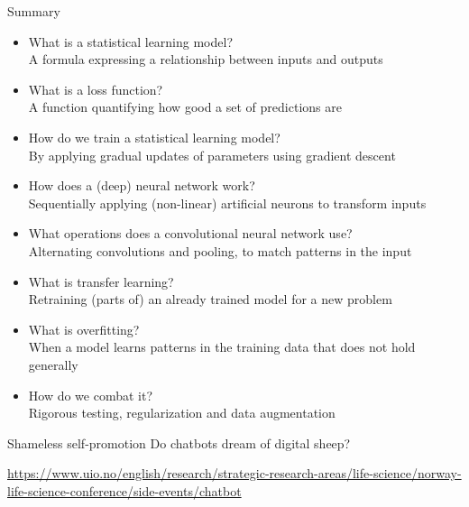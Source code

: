 \documentclass[8pt]{beamer}
\begin{document}
	\begin{frame}{Summary}
		\vfill
		\begin{itemize}
			\item{What is a statistical learning model?\\
				  \textcolor{answers}{A formula expressing a relationship between inputs and outputs}}
			\item{What is a loss function?\\
				  \textcolor{answers}{A function quantifying how good a set of predictions are}}
			\item{How do we train a statistical learning model?\\
				  \textcolor{answers}{By applying gradual updates of parameters using gradient descent}}
			\item{How does a (deep) neural network work?\\
				  \textcolor{answers}{Sequentially applying (non-linear) artificial neurons to transform inputs}}
			\item{What operations does a convolutional neural network use?\\
				  \textcolor{answers}{Alternating convolutions and pooling, to match patterns in the input}}
			\item{What is transfer learning?\\
				  \textcolor{answers}{Retraining (parts of) an already trained model for a new problem}}
			\item{What is overfitting?\\
				  \textcolor{answers}{When a model learns patterns in the training data that does not hold generally}}
			\item{How do we combat it?\\
				  \textcolor{answers}{Rigorous testing, regularization and data augmentation}}
		\end{itemize}
		\vfill
	\end{frame}

	\begin{frame}{Shameless self-promotion}
		\centering
		\vfill
		\huge{Do chatbots dream of digital sheep?}
		\vspace{0.2cm}
		\small{\url{https://www.uio.no/english/research/strategic-research-areas/life-science/norway-life-science-conference/side-events/chatbot}}
		\vfill
	\end{frame}
\end{document}
